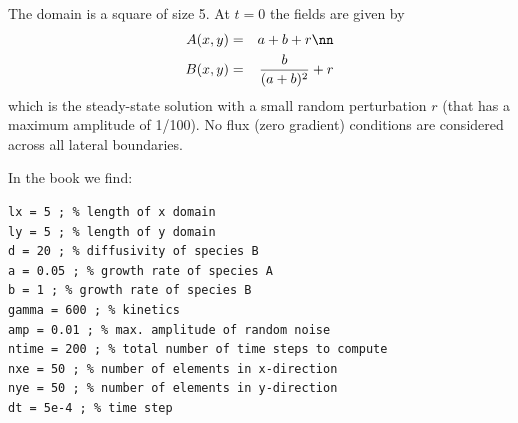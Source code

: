The domain is a square of size 5. At $t=0$ the fields are given by
\begin{eqnarray}
A(x,y)&=&a+b+r \nn\\
B(x,y)&=& \frac{b}{(a+b)^2} +r
\end{eqnarray}
which is the steady-state solution with a small random perturbation $r$ (that has a maximum amplitude
of 1/100). No flux (zero gradient) conditions are considered across all lateral boundaries.

In the book we find: 
\begin{verbatim}
lx = 5 ; % length of x domain
ly = 5 ; % length of y domain
d = 20 ; % diffusivity of species B
a = 0.05 ; % growth rate of species A
b = 1 ; % growth rate of species B
gamma = 600 ; % kinetics
amp = 0.01 ; % max. amplitude of random noise
ntime = 200 ; % total number of time steps to compute
nxe = 50 ; % number of elements in x-direction
nye = 50 ; % number of elements in y-direction
dt = 5e-4 ; % time step
\end{verbatim}


